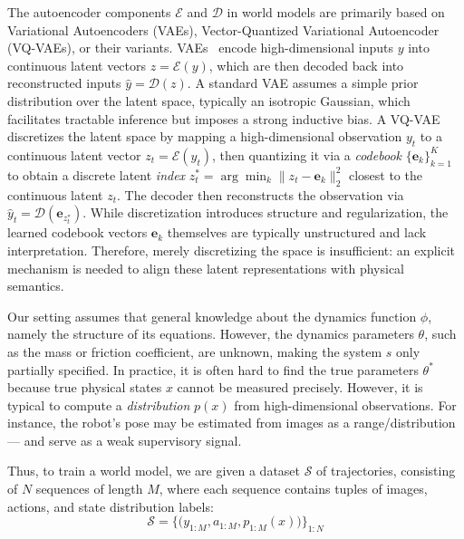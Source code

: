 \documentclass[nonacm,sigconf]{acmart}
\begin{document}
 
The autoencoder components $\mathcal{E}$ and $\mathcal{D}$ in world models are primarily based on Variational Autoencoders (VAEs), Vector-Quantized Variational Autoencoder (VQ-VAEs), or their variants. VAEs~\cite[]{kingma2013auto} encode high-dimensional inputs \( y \) into continuous latent vectors \( z = \mathcal{E}(y) \), which are then decoded back into reconstructed inputs \( \hat{y} = \mathcal{D}(z) \). A standard VAE assumes a simple prior distribution over the latent space, typically an isotropic Gaussian, which facilitates tractable inference but imposes a strong inductive bias.  A VQ-VAE~\cite[]{van2017neural} discretizes the latent space by mapping a high-dimensional observation \( y_t \) to a continuous latent vector \( z_t = \mathcal{E}(y_t) \), then quantizing it via a \textit{codebook} \( \{\mathbf{e}_k\}_{k=1}^K \) to obtain a discrete latent \textit{index} \( z_t^* = \arg\min_k \|z_t - \mathbf{e}_k\|_2^2 \) closest to the continuous latent $z_t$. The decoder then reconstructs the observation via \( \hat{y}_t = \mathcal{D}(\mathbf{e}_{z_t^*}) \). While discretization introduces structure and regularization, the learned codebook vectors \( \mathbf{e}_k \) themselves are typically unstructured and lack interpretation.  Therefore, merely discretizing the space is insufficient: an explicit mechanism is needed to align these latent representations with physical semantics.



Our setting assumes that general knowledge about the dynamics function \( \phi \), namely the structure of its equations. However, the dynamics parameters \( \theta \), such as the mass or friction coefficient, are unknown, making the system $s$ only partially specified. In practice, it is often hard to find the true parameters $\theta^*$ because true physical states $x$ cannot be measured precisely. However, it is typical to compute a \textit{distribution} $p(x)$ from high-dimensional observations. For instance, the robot's pose may be estimated from images as a range/distribution --- and serve as a weak supervisory signal.

Thus, to train a world model, we are given a dataset \( \mathcal{S} \) of trajectories, consisting of \( N \) sequences of length \( M \), where each sequence contains tuples of images, actions, and state distribution labels:
\begin{equation}
 \mathcal{S} = \Big\{ \big(y_{1:M}, a_{1:M}, p_{1:M}(x) \big) \Big\}_{1:N}
\end{equation}
\end{document}
